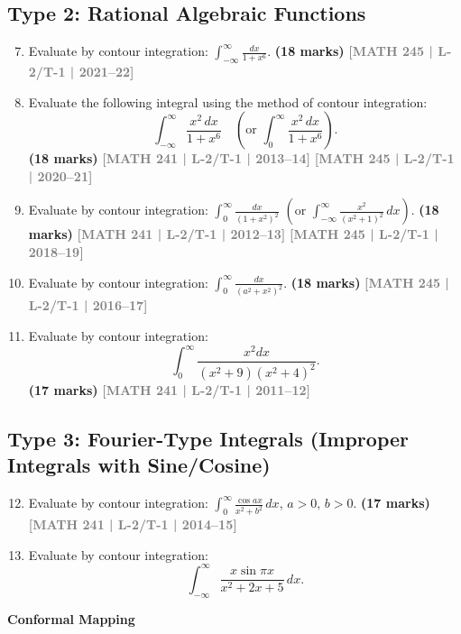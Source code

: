 \documentclass[12pt,a3paper]{article}
\newcommand{\yr}[1]{\hfill\textcolor{gray}{\small\textbf{[#1]}}}
\newcommand{\mk}[1]{\textcolor{orange!70!black}{\small\textbf{(#1 marks)}}}
\newcommand{\subtopic}[2]{%
  \vspace{10pt}
  \noindent\begin{tcolorbox}[colback=#1!8,colframe=#1,boxrule=0.6pt,arc=4pt,
    left=6pt,right=6pt,top=4pt,bottom=4pt]
    \small\bfseries\textcolor{#1}{#2}
  \end{tcolorbox}
  \vspace{2pt}
}
\begin{document}
\subsection*{Type 2: Rational Algebraic Functions}

\begin{enumerate}
\setcounter{enumi}{6}

\item Evaluate by contour integration: $\displaystyle\int_{-\infty}^{\infty}\frac{dx}{1+x^{6}}$.
\mk{18} \yr{MATH 245 | L-2/T-1 | 2021--22} 


\item Evaluate the following integral using the method of contour integration:
\[
\int_{-\infty}^{\infty} \frac{x^{2}\,dx}{1+x^{6}} \quad \left(\text{or } \int_{0}^{\infty} \frac{x^{2}\,dx}{1+x^{6}}\right).
\]
\mk{18} \yr{MATH 241 | L-2/T-1 | 2013--14} \yr{MATH 245 | L-2/T-1 | 2020--21}


\item Evaluate by contour integration: $\displaystyle\int_{0}^{\infty}\frac{dx}{(1+x^{2})^{2}}$ \quad $\left(\text{or } \int_{-\infty}^{\infty} \frac{x^{2}}{{(x^{2}+1)}^{2}}\,dx\right)$.
\mk{18} \yr{MATH 241 | L-2/T-1 | 2012--13} \yr{MATH 245 | L-2/T-1 | 2018--19}


\item Evaluate by contour integration: $\displaystyle\int_{0}^{\infty}\frac{dx}{(a^{2}+x^{2})^{2}}$.
\mk{18} \yr{MATH 245 | L-2/T-1 | 2016--17}


\item Evaluate by contour integration:
\[
\int_{0}^{\infty} \frac{x^2 dx}{(x^2 + 9)(x^2 + 4)^2}.
\]
\mk{17} \yr{MATH 241 | L-2/T-1 | 2011--12}


\end{enumerate}


\subsection*{Type 3: Fourier-Type Integrals (Improper Integrals with Sine/Cosine)}

\begin{enumerate}
\setcounter{enumi}{11}

\item Evaluate by contour integration: $\displaystyle\int_{0}^{\infty}\frac{\cos ax}{x^{2}+b^{2}}\,dx$, \quad $a>0,\,b>0$.
\mk{17} \yr{MATH 241 | L-2/T-1 | 2014--15}


\item Evaluate by contour integration:
\[
\int_{-\infty}^{\infty} \frac{x\sin\pi x}{x^{2}+2x+5}\,dx.
\]


\end{enumerate}
\subtopic{cE}{Conformal Mapping}
\label{sub:s5-conformal}
\end{document}
